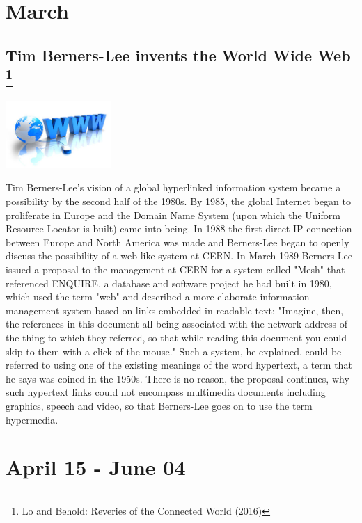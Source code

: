 \documentclass[11pt]{report}
\begin{document}
\section{March}
\subsection{Tim Berners-Lee invents the World Wide Web \protect\footnote{Lo and Behold: Reveries of the Connected World (2016)}}
\vspace{2mm}\begin{center}\includegraphics[width=4cm]{./img/www.jpg}\end{center}
Tim Berners-Lee's vision of a global hyperlinked information system became a possibility by the second half of the 1980s. By 1985, the global Internet began to proliferate in Europe and the Domain Name System (upon which the Uniform Resource Locator is built) came into being. In 1988 the first direct IP connection between Europe and North America was made and Berners-Lee began to openly discuss the possibility of a web-like system at CERN. In March 1989 Berners-Lee issued a proposal to the management at CERN for a system called "Mesh" that referenced ENQUIRE, a database and software project he had built in 1980, which used the term "web" and described a more elaborate information management system based on links embedded in readable text: "Imagine, then, the references in this document all being associated with the network address of the thing to which they referred, so that while reading this document you could skip to them with a click of the mouse." Such a system, he explained, could be referred to using one of the existing meanings of the word hypertext, a term that he says was coined in the 1950s. There is no reason, the proposal continues, why such hypertext links could not encompass multimedia documents including graphics, speech and video, so that Berners-Lee goes on to use the term hypermedia.

\section{April 15 - June 04}
\end{document}

